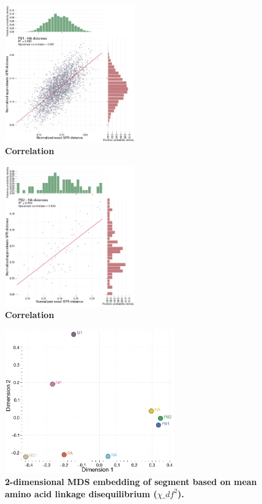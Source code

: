 \documentclass[11pt,oneside,letterpaper]{article}
\begin{document}
\begin{figure}
\centering  
\includegraphics[width=0.5\textwidth]  {supp_figures/InfB_supp_PB1-HA_corr.png}
\caption{\textbf{Correlation}}
\label{}
\end{figure}

\begin{figure}
\centering  
\includegraphics[width=0.5\textwidth]  {supp_figures/InfB_supp_PB2-HA_corr.png}
\caption{\textbf{Correlation}}
\label{}
\end{figure}

\clearpage

\begin{figure}
\centering  
\includegraphics[width=0.65\textwidth]  {supp_figures/InfB_8x8_aaLD_MDS.png}
\caption{\textbf{2-dimensional MDS embedding of segment based on mean amino acid linkage disequilibrium ($\chi\_{df}^{2}$).}}
\label{}
\end{figure}
\end{document}
